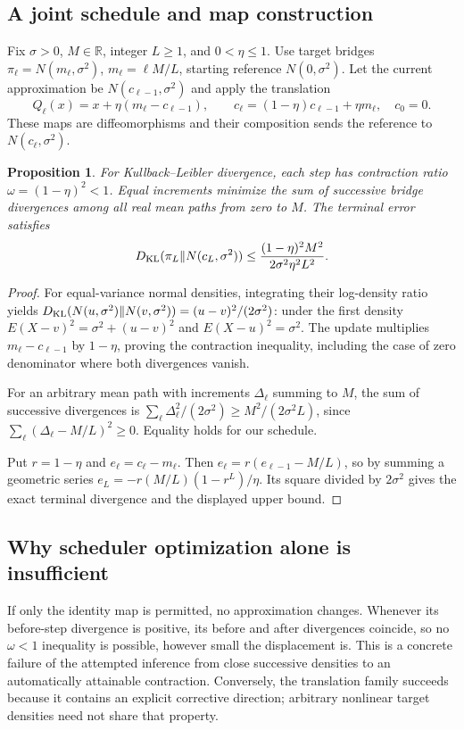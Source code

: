 \documentclass[11pt]{article}
\newtheorem{proposition}{Proposition}
\begin{document}
\subsection{A joint schedule and map construction}
Fix $\sigma>0$, $M\in\mathbb R$, integer $L\ge1$, and $0<\eta\le1$. Use target bridges $\pi_\ell=N(m_\ell,\sigma^2)$, $m_\ell=\ell M/L$, starting reference $N(0,\sigma^2)$. Let the current approximation be $N(c_{\ell-1},\sigma^2)$ and apply the translation
\[
 Q_\ell(x)=x+\eta(m_\ell-c_{\ell-1}),\qquad
 c_\ell=(1-\eta)c_{\ell-1}+\eta m_\ell,
 \quad c_0=0.
\]
These maps are diffeomorphisms and their composition sends the reference to $N(c_\ell,\sigma^2)$.
\begin{proposition}
For Kullback--Leibler divergence, each step has contraction ratio $\omega=(1-\eta)^2<1$. Equal increments minimize the sum of successive bridge divergences among all real mean paths from zero to $M$. The terminal error satisfies
\[
 D_{\rm KL}(\pi_L\|N(c_L,\sigma^2))
 \le \frac{(1-\eta)^2M^2}{2\sigma^2\eta^2L^2}.
\]
\end{proposition}
\begin{proof}
For equal-variance normal densities, integrating their log-density ratio yields $D_{\rm KL}(N(u,\sigma^2)\|N(v,\sigma^2))=(u-v)^2/(2\sigma^2)$: under the first density $E(X-v)^2=\sigma^2+(u-v)^2$ and $E(X-u)^2=\sigma^2$. The update multiplies $m_\ell-c_{\ell-1}$ by $1-\eta$, proving the contraction inequality, including the case of zero denominator where both divergences vanish.

For an arbitrary mean path with increments $\Delta_\ell$ summing to $M$, the sum of successive divergences is $\sum_\ell\Delta_\ell^2/(2\sigma^2)\ge M^2/(2\sigma^2L)$, since $\sum_\ell(\Delta_\ell-M/L)^2\ge0$. Equality holds for our schedule.

Put $r=1-\eta$ and $e_\ell=c_\ell-m_\ell$. Then $e_\ell=r(e_{\ell-1}-M/L)$, so by summing a geometric series $e_L=-r(M/L)(1-r^L)/\eta$. Its square divided by $2\sigma^2$ gives the exact terminal divergence and the displayed upper bound.
\end{proof}
\subsection{Why scheduler optimization alone is insufficient}
If only the identity map is permitted, no approximation changes. Whenever its before-step divergence is positive, its before and after divergences coincide, so no $\omega<1$ inequality is possible, however small the displacement is. This is a concrete failure of the attempted inference from close successive densities to an automatically attainable contraction. Conversely, the translation family succeeds because it contains an explicit corrective direction; arbitrary nonlinear target densities need not share that property.
\end{document}
